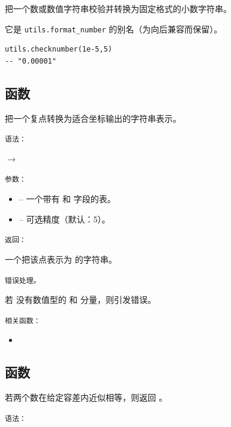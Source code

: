 把一个数或数值字符串校验并转换为固定格式的小数字符串。

它是 \verb|utils.format_number| 的别名（为向后兼容而保留）。

\begin{verbatim}
utils.checknumber(1e-5,5)
-- "0.00001"
\end{verbatim}




\subsection{函数 }
\label{sub:function_utils_format_point}

把一个复点转换为适合坐标输出的字符串表示。

\texttt{语法： }

\begin{center}
 \hfill $\rightarrow$ 
\end{center}

\medskip
\texttt{参数： }

\begin{itemize}
\item {} – 一个带有  和  字段的表。
\item {} – 可选精度（默认：5）。
\end{itemize}

\medskip
\texttt{返回： }

一个把该点表示为  的字符串。

\medskip
\texttt{错误处理。}

若  没有数值型的  和  分量，则引发错误。

\medskip
\texttt{相关函数： }

\begin{itemize}
\item {}
\end{itemize}

\subsection{函数 }
\label{sub:function_utils_almost_equal}

若两个数在给定容差内近似相等，则返回 。

\medskip
\texttt{语法： }

